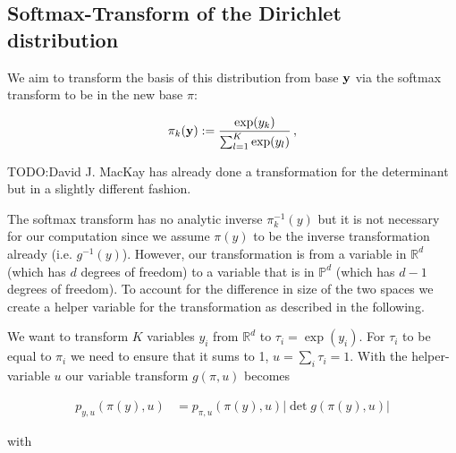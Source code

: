 \subsection{Softmax-Transform of the Dirichlet distribution}

We aim to transform the basis of this distribution from base $\mathbf{y}$ via the softmax transform to be in the new base $\pi$:

\begin{equation}\label{eq:softmax}
\pi_k(\mathbf{y}) := \frac{\exp(y_k)}{\sum_{l=1}^K \exp(y_l)} \, ,
\end{equation}


TODO:David J. MacKay has already done a transformation for the determinant but in a slightly different fashion. 

The softmax transform has no analytic inverse $\pi_k^{-1}(y)$ but it is not necessary for our computation since we assume $\pi(y)$ to be the inverse transformation already (i.e. $g^{-1}(y)$). However, our transformation is from a variable in $\mathbb{R}^d$ (which has $d$ degrees of freedom) to a variable that is in $\mathbb{P}^d$ (which has $d-1$ degrees of freedom). To account for the difference in size of the two spaces we create a helper variable for the transformation as described in the following.

We want to transform $K$ variables $y_i$ from $\mathbb{R}^d$ to $\tau_i = \exp(y_i)$. For $\tau_i$ to be equal to $\pi_i$ we need to ensure that it sums to 1, $u = \sum_i \tau_i = 1$. With the helper-variable $u$ our variable transform $g(\pi, u)$ becomes

\begin{align}
	p_{y,u}(\pi(y), u) &= p_{\pi, u}(\pi(y), u) |\det g(\pi(y), u)|
\end{align}

with 

